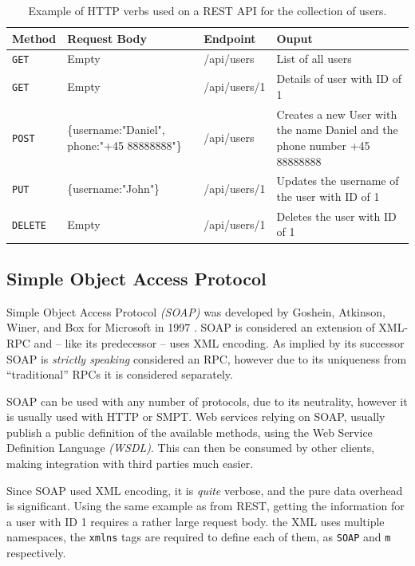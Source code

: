 			\begin{table}
				\begin{tabular}{p{} | p{} | p{} | p{}}
					Method & Request Body & Endpoint & Ouput \\
					\hline
					\verb=GET= & Empty & /api/users & List of all users \\
					\hline
					\verb=GET= & Empty & /api/users/1 & Details of user with ID of 1 \\
					\hline
					\verb=POST= & \{username:"Daniel", phone:"+45 88888888"\} & /api/users & Creates a new User with the name Daniel and the phone number +45 88888888 \\
					\hline
					\verb=PUT= & \{username:"John"\} & /api/users/1 & Updates the username of the user with ID of 1\\
					\hline
					\verb=DELETE= & Empty & /api/users/1 & Deletes the user with ID of 1\\
				\end{tabular}

				\caption{Example of HTTP verbs used on a REST API for the collection of users.}
				\label{tbl:rest_example}

			\end{table}

		\subsection{Simple Object Access Protocol}
			Simple Object Access Protocol \emph{(SOAP)} was developed by Goshein, Atkinson, Winer, and Box for Microsoft in 1997 \cite{soap_origin}. SOAP is considered an extension of XML-RPC and -- like its predecessor -- uses XML encoding. As implied by its successor SOAP is \emph{strictly speaking} considered an RPC, however due to its uniqueness from ``traditional'' RPCs it is considered separately.

			SOAP can be used with any number of protocols, due to its neutrality, however it is usually used with HTTP or SMPT. Web services relying on SOAP, usually publish a public definition of the available methods, using the Web Service Definition Language \emph{(WSDL)}. This can then be consumed by other clients, making integration with third parties much easier.

			Since SOAP used XML encoding, it is \emph{quite} verbose, and the pure data overhead is significant. Using the same example as from REST, getting the information for a user with ID 1 requires a rather large request body. the XML uses multiple namespaces, the \verb=xmlns= tags are required to define each of them, as \verb=SOAP= and \verb=m= respectively.

